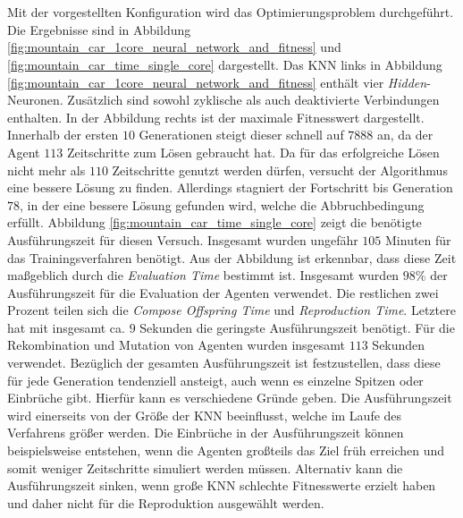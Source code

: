\\\\
Mit der vorgestellten Konfiguration wird das Optimierungsproblem durchgeführt. Die Ergebnisse sind in Abbildung \ref{fig:mountain_car_1core_neural_network_and_fitness} und \ref{fig:mountain_car_time_single_core} dargestellt. Das \ac{KNN} links in Abbildung \ref{fig:mountain_car_1core_neural_network_and_fitness} enthält vier \emph{Hidden}-Neuronen. Zusätzlich sind sowohl zyklische als auch deaktivierte Verbindungen enthalten. In der Abbildung rechts ist der maximale Fitnesswert dargestellt. Innerhalb der ersten $10$ Generationen steigt dieser schnell auf $7888$ an, da der Agent $113$ Zeitschritte zum Lösen gebraucht hat. Da für das erfolgreiche Lösen nicht mehr als $110$ Zeitschritte genutzt werden dürfen, versucht der Algorithmus eine bessere Lösung zu finden. Allerdings stagniert der Fortschritt bis Generation $78$, in der eine bessere Lösung gefunden wird, welche die Abbruchbedingung erfüllt. Abbildung \ref{fig:mountain_car_time_single_core} zeigt die benötigte Ausführungszeit für diesen Versuch. Insgesamt wurden ungefähr $105$ Minuten für das Trainingsverfahren benötigt. Aus der Abbildung ist erkennbar, dass diese Zeit maßgeblich durch die \emph{Evaluation Time} bestimmt ist. Insgesamt wurden $98\%$ der Ausführungszeit für die Evaluation der Agenten verwendet. Die restlichen zwei Prozent teilen sich die \emph{Compose Offspring Time} und \emph{Reproduction Time}. Letztere hat mit insgesamt ca. $9$ Sekunden die geringste Ausführungszeit benötigt. Für die Rekombination und Mutation von Agenten wurden insgesamt $113$ Sekunden verwendet. Bezüglich der gesamten Ausführungszeit ist festzustellen, dass diese für jede Generation tendenziell ansteigt, auch wenn es einzelne Spitzen oder Einbrüche gibt. Hierfür kann es verschiedene Gründe geben. Die Ausführungszeit wird einerseits von der Größe der \ac{KNN} beeinflusst, welche im Laufe des Verfahrens größer werden. Die Einbrüche in der Ausführungszeit können beispielsweise entstehen, wenn die Agenten großteils das Ziel früh erreichen und somit weniger Zeitschritte simuliert werden müssen. Alternativ kann die Ausführungszeit sinken, wenn große \ac{KNN} schlechte Fitnesswerte erzielt haben und daher nicht für die Reproduktion ausgewählt werden.  
